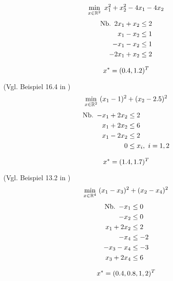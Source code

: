 \begin{testproblem}
\begin{equation}
\min_{x\in\mathbb{R}^2}\ x_1^2 + x_2^2 - 4 x_1 - 4 x_2
\end{equation}
\begin{equation*}
\begin{split}
\nb 2 x_1 + x_2 & \leq 2 \\
x_1 - x_2 & \leq 1 \\
-x_1 - x_2 & \leq 1 \\
-2 x_1 + x_2 & \leq 2 \\
\end{split}
\end{equation*}

\begin{equation*}
x^* = (0.4, 1.2)^T
\end{equation*}
\end{testproblem}

\begin{testproblem}
(Vgl. Beispiel 16.4 in \cite[S.~475]{nocedal})
\begin{equation}
\min_{x\in\mathbb{R}^2}\ (x_1 - 1)^2 + (x_2 - 2.5)^2
\end{equation}
\begin{equation*}
\begin{split}
\nb -x_1 + 2 x_2 & \leq 2 \\
x_1 + 2 x_2 & \leq 6 \\
x_1 - 2 x_2 & \leq 2 \\
0 & \leq x_i,\ i = 1,2 \\
\end{split}
\end{equation*}

\begin{equation*}
x^* = (1.4, 1.7)^T
\end{equation*}
\end{testproblem}

\begin{testproblem}
(Vgl. Beispiel 13.2 in \cite[S.~415f]{antoniou})
\begin{equation}
\min_{x\in\mathbb{R}^4}\ (x_1 - x_3)^2 + (x_2 - x_4)^2
\end{equation}
\begin{equation*}
\begin{split}
\nb -x_1 & \leq 0 \\
-x_2 & \leq 0 \\
x_1 + 2 x_2 & \leq 2 \\
-x_4 & \leq -2 \\
-x_3 - x_4 & \leq -3 \\
x_3 + 2 x_4 & \leq 6 \\
\end{split}
\end{equation*}

\begin{equation*}
x^* = (0.4, 0.8, 1, 2)^T
\end{equation*}
\end{testproblem}

